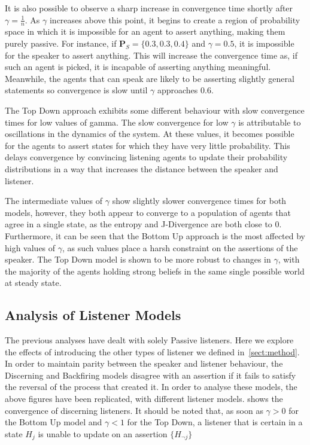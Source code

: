 It is also possible to observe a sharp increase in convergence time shortly after $ \gamma = \frac{1}{n}$. As $\gamma$ increases above this point, it begins to create a region of probability space in which it is impossible for an agent to assert anything, making them purely passive. For instance, if $\mathbf{P}_S =\{ 0.3, 0.3, 0.4\}$ and $\gamma = 0.5$, it is impossible for the speaker to assert anything. This will increase the convergence time as, if such an agent is picked, it is incapable of asserting anything meaningful. Meanwhile, the agents that can speak are likely to be asserting slightly general statements so convergence is slow until $\gamma$ approaches $0.6$. 

The Top Down approach exhibits some different behaviour with slow convergence times for low values of gamma. The slow convergence for low $\gamma$ is attributable to oscillations in the dynamics of the system. At these values, it becomes possible for the agents to assert states for which they have very little probability. This delays convergence by convincing listening agents to update their probability distributions in a way that increases the distance between the speaker and listener. 

The intermediate values of $\gamma$ show slightly slower convergence times for both models, however, they both appear to converge to a population of agents that agree in a single state, as the entropy and J-Divergence are both close to $0$. Furthermore, it can be seen that the Bottom Up approach is the most affected by high values of $\gamma$, as such values place a harsh constraint on the assertions of the speaker. The Top Down model is shown to be more robust to changes in $\gamma$, with the majority of the agents holding strong beliefs in the same single possible world at steady state.  


\subsection{Analysis of Listener Models}

The previous analyses have dealt with solely Passive listeners. Here we explore the effects of introducing the other types of listener we defined in~\cref{sect:method}. In order to maintain parity between the speaker and listener behaviour, the Discerning and Backfiring models disagree with an assertion if it fails to satisfy the reversal of the process that created it. In order to analyse these models, the above figures have been replicated, with different listener models.  shows the convergence of discerning listeners. It should be noted that, as soon as $\gamma > 0$ for the Bottom Up model and $\gamma < 1$ for the Top Down, a listener that is certain in a state $H_j$ is unable to update on an assertion $\{ H_{¬j} \}$


